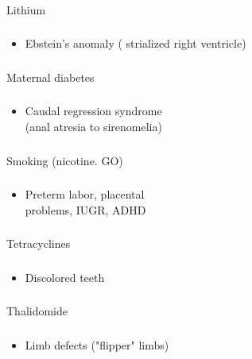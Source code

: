 \documentclass[11pt]{beamer}
\begin{document}
\begin{frame}
 \frametitle{}
Lithium
\end{frame}

\begin{frame}
 \frametitle{}
\begin{itemize}
\item{Ebstein's anomaly ( strialized right ventricle) }
\end{itemize}
\end{frame}

\begin{frame}
 \frametitle{}
Maternal diabetes
\end{frame}

\begin{frame}
 \frametitle{}
\begin{itemize}
\item{Caudal regression syndrome \\ (anal atresia to sirenomelia)}
\end{itemize}
\end{frame}

\begin{frame}
 \frametitle{}
Smoking (nicotine. GO)
\end{frame}

\begin{frame}
 \frametitle{}
\begin{itemize}
\item{Preterm labor, placental \\ problems, IUGR, ADHD}
\end{itemize}
\end{frame}

\begin{frame}
 \frametitle{}
Tetracyclines
\end{frame}

\begin{frame}
 \frametitle{}
\begin{itemize}
\item{Discolored teeth}
\end{itemize}
\end{frame}

\begin{frame}
 \frametitle{}
Thalidomide
\end{frame}

\begin{frame}
 \frametitle{}
\begin{itemize}
\item{Limb defects ("flipper" limbs)}
\end{itemize}
\end{frame}
\end{document}

